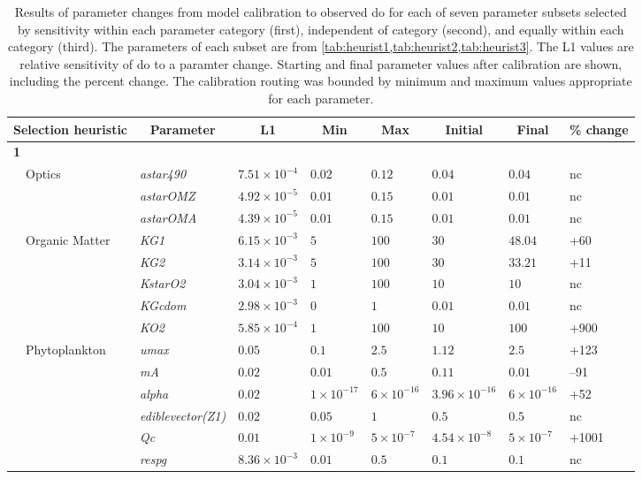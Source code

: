 \documentclass[review]{elsarticle}\usepackage[]{graphicx}\usepackage[]{color}
\begin{document}
\begin{table}[!tbp]
{\scriptsize
\caption{Results of parameter changes from model calibration to observed \ac{do} for each of seven parameter subsets selected by sensitivity within each parameter category (first), independent of category (second), and equally within each category (third). The parameters of each subset are from \cref{tab:heurist1,tab:heurist2,tab:heurist3}.  The L1 values are relative sensitivity of \ac{do} to a paramter change.  Starting and final parameter values after calibration are shown, including the percent change.  The calibration routing was bounded by minimum and maximum values appropriate for each parameter.\label{tab:calibprm}} 
\begin{center}
\begin{tabular}{llllllll}
\hline\hline
\multicolumn{1}{l}{Selection heuristic}&\multicolumn{1}{c}{Parameter}&\multicolumn{1}{c}{L1}&\multicolumn{1}{c}{Min}&\multicolumn{1}{c}{Max}&\multicolumn{1}{c}{Initial}&\multicolumn{1}{c}{Final}&\multicolumn{1}{c}{\% change}\tabularnewline
\hline
{\bfseries 1}&&&&&&&\tabularnewline
~~Optics&\textit{astar490}&$7.51\times 10^{-4}$&$0.02$&$0.12$&$0.04$&$0.04$&nc\tabularnewline
~~&\textit{astarOMZ}&$4.92\times 10^{-5}$&$0.01$&$0.15$&$0.01$&$0.01$&nc\tabularnewline
~~&\textit{astarOMA}&$4.39\times 10^{-5}$&$0.01$&$0.15$&$0.01$&$0.01$&nc\tabularnewline
~~Organic Matter&\textit{KG1}&$6.15\times 10^{-3}$&$5$&$100$&$30$&$48.04$&+60\tabularnewline
~~&\textit{KG2}&$3.14\times 10^{-3}$&$5$&$100$&$30$&$33.21$&+11\tabularnewline
~~&\textit{KstarO2}&$3.04\times 10^{-3}$&$1$&$100$&$10$&$10$&nc\tabularnewline
~~&\textit{KGcdom}&$2.98\times 10^{-3}$&$0$&$1$&$0.01$&$0.01$&nc\tabularnewline
~~&\textit{KO2}&$5.85\times 10^{-4}$&$1$&$100$&$10$&$100$&+900\tabularnewline
~~Phytoplankton&\textit{umax}&$0.05$&$0.1$&$2.5$&$1.12$&$2.5$&+123\tabularnewline
~~&\textit{mA}&$0.02$&$0.01$&$0.5$&$0.11$&$0.01$&--91\tabularnewline
~~&\textit{alpha}&$0.02$&$1\times 10^{-17}$&$6\times 10^{-16}$&$3.96\times 10^{-16}$&$6\times 10^{-16}$&+52\tabularnewline
~~&\textit{ediblevector(Z1)}&$0.02$&$0.05$&$1$&$0.5$&$0.5$&nc\tabularnewline
~~&\textit{Qc}&$0.01$&$1\times 10^{-9}$&$5\times 10^{-7}$&$4.54\times 10^{-8}$&$5\times 10^{-7}$&+1001\tabularnewline
~~&\textit{respg}&$8.36\times 10^{-3}$&$0.01$&$0.5$&$0.1$&$0.1$&nc\tabularnewline

\end{tabular}
\end{center}}
\end{table}
\end{document}
